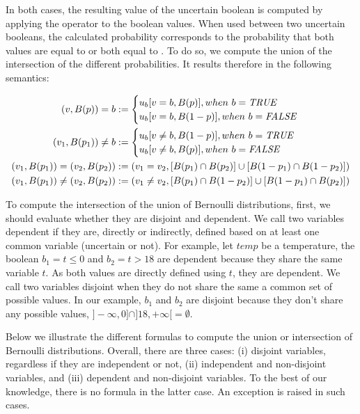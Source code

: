 In both cases, the resulting value of the uncertain boolean is computed by applying the operator to the boolean values.
When used between two uncertain booleans, the calculated probability corresponds to the probability that both values are equal to \true{} or both equal to \false{}.
To do so, we compute the union of the intersection of the different probabilities.
It results therefore in the following semantics:

\begin{align*}
	(v, B(p)) = b &:=  \begin{cases}
		 					   		u_b[v = b, B(p)], when~b = \textit{TRUE}{}\\
		 							u_b[v = b, B(1-p)], when~b = \textit{FALSE}{}
		 						\end{cases}\\
	(v_1, B(p_1)) \ne b &:=  \begin{cases}
		 										u_b[v \ne b, B(1 - p)], when~b = \textit{TRUE}{}\\
		 										u_b[v \ne b, B(p)], when~b = \textit{FALSE}{}
		 									\end{cases}\\
	(v_1, B(p_1)) = (v_2, B(p_2)) &:= (v_1=v_2, [B(p_1) \cap B(p_2)] \cup [B(1 - p_1) \cap B(1 - p_2)])\\
	(v_1, B(p_1)) \ne (v_2, B(p_2)) &:= (v_1 \ne v_2, [B(p_1) \cap B(1-p_2)] \cup [B(1 - p_1) \cap B(p_2)])	 										 						
\end{align*}

To compute the intersection of the union of Bernoulli distributions, first, we should evaluate whether they are disjoint and dependent.
We call two variables dependent if they are, directly or indirectly, defined based on at least one common variable (uncertain or not).
For example, let $temp$ be a temperature, the boolean $b_1 = t \leqslant 0$ and  $b_2 = t > 18$ are dependent because they share the same variable $t$.
As both values are directly defined using $t$, they are dependent. 
We call two variables disjoint when they do not share the same a common set of possible values.
In our example, $b_1$ and $b_2$ are disjoint because they don't share any possible values, \ie $]-\infty, 0] \cap ]18,+\infty[ = \emptyset$.

Below we illustrate the different formulas to compute the union or intersection of Bernoulli distributions.
Overall, there are three cases: (i) disjoint variables, regardless if they are independent or not, (ii) independent and non-disjoint variables, and (iii) dependent and non-disjoint variables.
To the best of our knowledge, there is no formula in the latter case.
An exception is raised in such cases.

